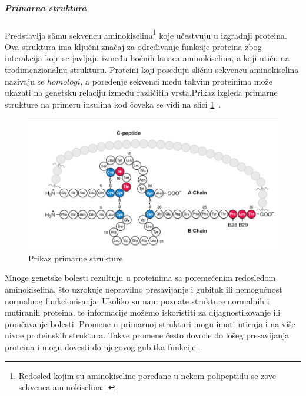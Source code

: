 \subparagraph{Primarna struktura}
Predstavlja s\^amu sekvencu aminokiselina\footnote{Redosled kojim su aminokiseline poređane u nekom polipeptidu se zove sekvenca aminokiselina~\cite{spasic}.} koje učestvuju u izgradnji proteina. Ova struktura ima ključni značaj za određivanje funkcije proteina zbog interakcija koje se javljaju između bočnih lanaca aminokiselina, a koji utiču na trodimenzionalnu strukturu. Proteini koji poseduju sličnu sekvencu aminokiselina nazivaju se $homologi$, a poređenje sekvenci među takvim proteinima može ukazati na genetsku relaciju između različitih vrsta.Prikaz izgleda primarne strukture na primeru insulina kod čoveka se vidi na slici \ref{fig:insulin}~\cite{spasic}.\\
\begin{figure}[H]
	\centering
    \includegraphics[width=1\textwidth]{Figures/BO/insulin.png}
    \caption{Prikaz primarne strukture~\cite{bmbg}}
    \label{fig:insulin}
\end{figure}

Mnoge genetske bolesti rezultuju u proteinima sa poremećenim redosledom aminokiselina, što uzrokuje nepravilno presavijanje i gubitak ili nemogućnost normalnog funkcionisanja. Ukoliko su nam poznate strukture normalnih i mutiranih proteina, te informacije možemo iskoristiti za dijagnostikovanje ili proučavanje bolesti. Promene u primarnoj strukturi mogu imati uticaja i na više nivoe proteinskih struktura. Takve promene često dovode do lošeg presavijanja proteina i mogu dovesti do njegovog gubitka funkcije~\cite{flash,lippincott}.

